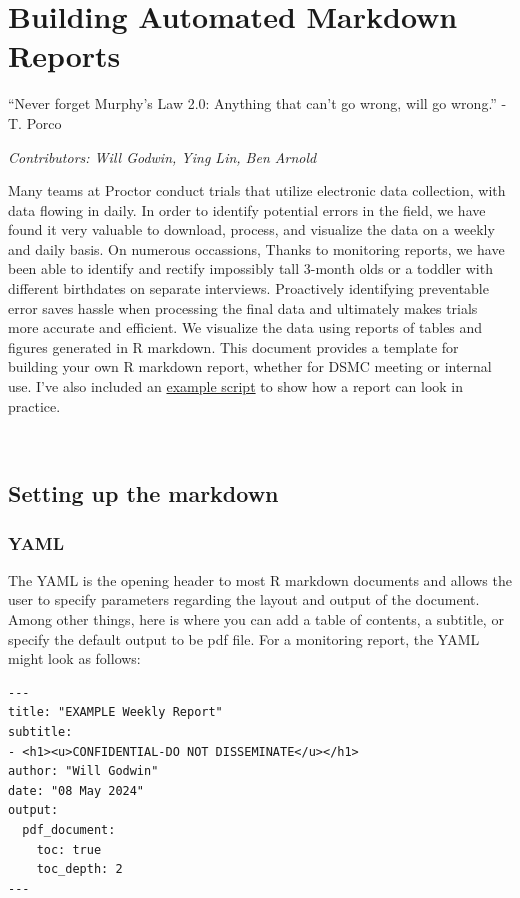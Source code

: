 \documentclass[
]{book}
\begin{document}
\chapter{Building Automated Markdown Reports}\label{building-automated-markdown-reports}

``Never forget Murphy's Law 2.0: Anything that can't go wrong, will go wrong.'' -T. Porco

\emph{Contributors: Will Godwin, Ying Lin, Ben Arnold}

Many teams at Proctor conduct trials that utilize electronic data collection, with data flowing in daily. In order to identify potential errors in the field, we have found it very valuable to download, process, and visualize the data on a weekly and daily basis. On numerous occassions, Thanks to monitoring reports, we have been able to identify and rectify impossibly tall 3-month olds or a toddler with different birthdates on separate interviews. Proactively identifying preventable error saves hassle when processing the final data and ultimately makes trials more accurate and efficient. We visualize the data using reports of tables and figures generated in R markdown. This document provides a template for building your own R markdown report, whether for DSMC meeting or internal use. I've also included an \href{templates/example_report.Rmd}{example script} to show how a report can look in practice.

\(~\)

\section{Setting up the markdown}\label{setting-up-the-markdown}

\subsection{YAML}\label{yaml}

The YAML is the opening header to most R markdown documents and allows the user to specify parameters regarding the layout and output of the document. Among other things, here is where you can add a table of contents, a subtitle, or specify the default output to be pdf file. For a monitoring report, the YAML might look as follows:

\begin{verbatim}
---
title: "EXAMPLE Weekly Report"
subtitle:
- <h1><u>CONFIDENTIAL-DO NOT DISSEMINATE</u></h1>
author: "Will Godwin"
date: "08 May 2024"
output:
  pdf_document:
    toc: true
    toc_depth: 2
---
\end{verbatim}
\end{document}
